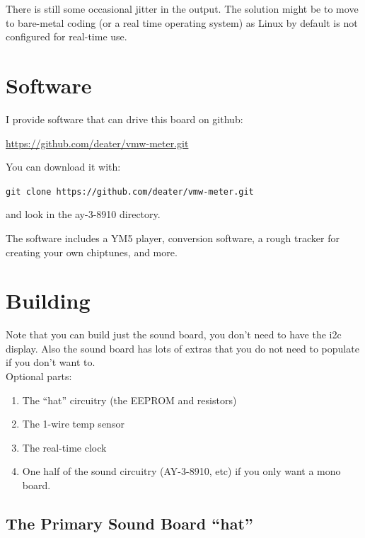 \documentclass[11pt]{article}
\begin{document}
There is still some occasional jitter in the output.
The solution might be to move to bare-metal coding (or a real time operating
system) as Linux by default is not configured for real-time use.





\section{Software}

I provide software that can drive this board on github:

\url{https://github.com/deater/vmw-meter.git}

\noindent
You can download it with:

{\tt git clone https://github.com/deater/vmw-meter.git}

\noindent
and look in the ay-3-8910 directory.

The software includes a YM5 player, conversion software, a rough tracker
for creating your own chiptunes, and more.



\section{Building}

Note that you can build just the sound board,
you don't need to have the i2c display.
Also the sound board has lots of extras that you do not
need to populate if you don't want to.\\

\noindent
Optional parts:
\begin{enumerate}
	\item The ``hat'' circuitry (the EEPROM and resistors)
	\item The 1-wire temp sensor
	\item The real-time clock
	\item One half of the sound circuitry (AY-3-8910, etc) if you only want
		a mono board.
\end{enumerate}


\subsection{The Primary Sound Board ``hat''}
\end{document}
